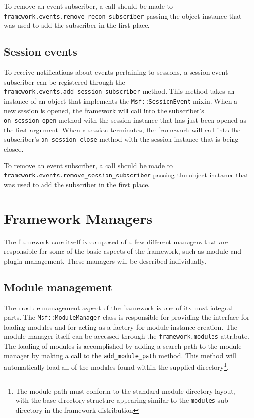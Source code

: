 \documentclass{report}
\begin{document}
\par
To remove an event subscriber, a call should be made to\\
\texttt{framework.events.remove\_recon\_subscriber} passing the
object instance that was used to add the subscriber in the first
place.

        \subsection{Session events}

\par
To receive notifications about events pertaining to sessions, a
session event subscriber can be registered through the
\texttt{framework.events.add\_session\_subscriber} method.  This
method takes an instance of an object that implements the
\texttt{Msf::SessionEvent} mixin.  When a new session is opened, the
framework will call into the subscriber's \texttt{on\_session\_open}
method with the session instance that has just been opened as the
first argument.  When a session terminates, the framework will call
into the subscriber's \texttt{on\_session\_close} method with the
session instance that is being closed.

\par
To remove an event subscriber, a call should be made to\\
\texttt{framework.events.remove\_session\_subscriber} passing the
object instance that was used to add the subscriber in the first
place.

    \section{Framework Managers}

\par
The framework core itself is composed of a few different managers
that are responsible for some of the basic aspects of the framework,
such as module and plugin management.  These managers will be
described individually.

        \subsection{Module management}

\par
The module management aspect of the framework is one of its most
integral parts.  The \texttt{Msf::ModuleManager} class is
responsible for providing the interface for loading modules and for
acting as a factory for module instance creation.  The module
manager itself can be accessed through the
\texttt{framework.modules} attribute.  The loading of modules is
accomplished by adding a search path to the module manager by making
a call to the \texttt{add\_module\_path} method.  This method will
automatically load all of the modules found within the supplied
directory\footnote{The module path must conform to the standard
module directory layout, with the base directory structure appearing
similar to the \texttt{modules} sub-directory in the framework
distribution}.
\end{document}
